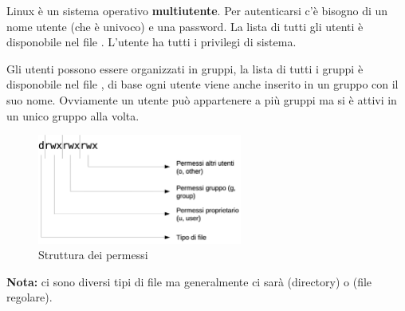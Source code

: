 \documentclass[../main.tex]{subfiles}
\begin{document}
Linux è un sistema operativo \textbf{multiutente}. Per autenticarsi c'è bisogno di un nome utente (che è univoco) e una password.
La lista di tutti gli utenti è disponobile nel file . L'utente  ha tutti i privilegi di sistema.

Gli utenti possono essere organizzati in gruppi, la lista di tutti i gruppi è disponobile nel file , di base
ogni utente viene anche inserito in un gruppo con il suo nome. Ovviamente un utente può appartenere a più gruppi ma si è attivi
in un unico gruppo alla volta.

\begin{figure}[h]
    \centering
    \includegraphics[width=0.6\textwidth]{../images/permessi.png}
    \caption{Struttura dei permessi}
\end{figure}
\textbf{Nota:} ci sono diversi tipi di file ma generalmente ci sarà  (directory) o \code{-} (file regolare).
\end{document}
